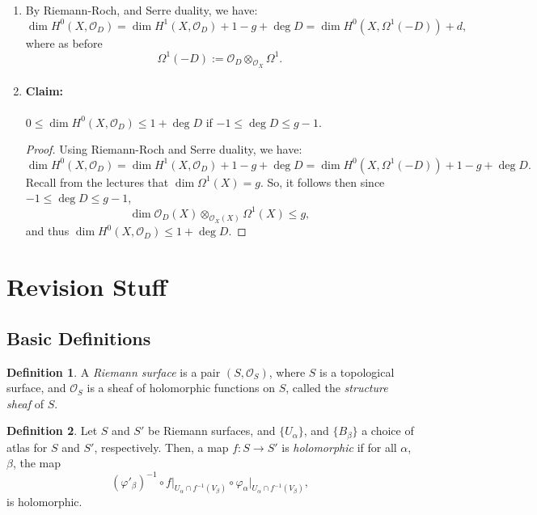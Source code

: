\documentclass[a4paper]{report}
\theoremstyle{definition}
\newtheorem{definition}{Definition}
\theoremstyle{remark}
\theoremstyle{proposition}
\theoremstyle{conjecture}
\theoremstyle{lemma}
\theoremstyle{corollary}
\theoremstyle{exercise}
\theoremstyle{example}
\newcommand{\mcal}{\mathcal}
\begin{document}
\begin{enumerate}
    \item By Riemann-Roch, and Serre duality, we have:
        $$\dim H^0(X,\mcal{O}_D) = \dim H^1(X,\mcal{O}_D) + 1 -g + \deg D = \dim H^0(X,\Omega^1(-D)) + d,$$
        where as before $$\Omega^1(-D) := \mcal{O}_D\otimes_{\mcal{O}_X} \Omega^1.$$

    \item \paragraph{Claim:} $0\leq \dim H^0(X,\mcal{O}_D) \leq 1 + \deg D$ if 
        $-1 \leq \deg D \leq g-1$.
        \begin{proof}
            Using Riemann-Roch and Serre duality, we have:
            $$\dim H^0(X,\mcal{O}_D) = \dim H^1(X,\mcal{O}_D) + 1 - g + \deg D = \dim H^0(X,\Omega^1(-D)) + 1- g + \deg D.$$
            Recall from the lectures that $\dim \Omega^1(X) = g$.
            So, it follows then since $-1 \leq \deg D \leq g-1$,
            $$\dim \mcal{O}_D(X)\otimes_{\mcal{O}_X(X)}\Omega^1(X) \leq g,$$
            and thus $\dim H^0(X,\mcal{O}_D) \leq 1 + \deg D$.
        \end{proof}
\end{enumerate}

\section{Revision Stuff}

\subsection{Basic Definitions}

\begin{definition}
    A \emph{Riemann surface} is a pair $(S,\mcal{O}_S)$, 
    where $S$ is a topological surface, and $\mcal{O}_S$ is a sheaf of 
    holomorphic functions on $S$, called the \emph{structure sheaf} of $S$.
\end{definition}

\begin{definition}
    Let $S$ and $S'$ be Riemann surfaces, and $\lbrace U_\alpha\rbrace$,
    and $\lbrace B_\beta\rbrace$ a choice of atlas for $S$ and $S'$,
    respectively. Then, a map $f : S \to S'$ is \emph{holomorphic}
    if for all $\alpha$, $\beta$, the map
    $$(\varphi'_\beta)^{-1} \circ f\vert_{U_\alpha\cap f^{-1}(V_\beta)} \circ \varphi_\alpha\vert_{U_\alpha \cap f^{-1}(V_\beta)},$$
    is holomorphic.
\end{definition}
\end{document}
